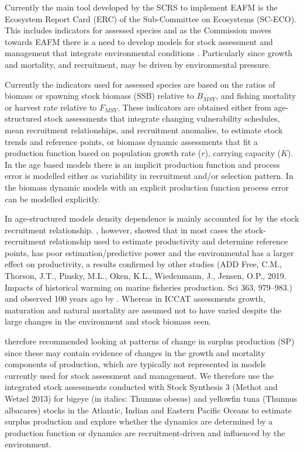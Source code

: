\documentclass[12pt,doublespacing,a4paper]{ouparticle}
\begin{document}
Currently the main tool developed by the SCRS to implement EAFM is the Ecosystem Report Card (ERC) of the Sub-Committee on Ecosystems (SC-ECO). This includes indicators for assessed species and as the Commission moves towards EAFM there is a need to develop models for stock assessment and management that integrate environmental conditions \citep{travis2014integrating}.  Particularly since growth and mortality, and recruitment, may be driven by environmental pressure.

Currently the indicators used for assessed species are based on the ratios of biomass or spawning stock biomass (SSB) relative to $B_{MSY}$, and fishing mortality or harvest rate relative to $F_{MSY}$. These indicators are obtained either from age-structured stock assessments that integrate changing vulnerability schedules, mean recruitment relationships, and recruitment anomalies, to estimate stock trends and reference points, or biomass dynamic assessments that fit a production function based on population growth rate ($r$), carrying capacity ($K$). In the age based models there is an implicit production function and process error is modelled either as variability in recruitment and/or selection pattern. In the biomass dynamic models with an explicit production function process error can be modelled explicitly.  

In age-structured models density dependence is mainly accounted for by the stock recruitment relationship. \cite{cury2014resolving}, however, showed that in most cases the stock-recruitment relationship used to estimate productivity and determine reference points, has poor estimation/predictive power and the environmental has a larger effect on productivity, a results confirmed by other studies \citep[e.g.][]{szuwalski2015examining, szuwalski2019global}(ADD Free, C.M., Thorson, J.T., Pinsky, M.L., Oken, K.L., Wiedenmann, J., Jensen, O.P., 2019. Impacts of historical warming on marine fisheries production. Sci 363, 979–983.) and observed 100 years ago by \cite{hjort1914fluctuations}. Whereas in ICCAT assessments growth, maturation and natural mortality are assumed not to have varied despite the large changes in the environment and stock biomass seen.

\cite{hilborn2001calculation} therefore recommended looking at patterns of change in surplus production (SP) since these may contain evidence of changes in the growth and mortality components of production, which are typically not represented in models currently used for stock assessment and management. 
We therefore use the integrated stock assessments conducted with Stock Synthesis 3 (Methot and Wetzel 2013) \cite[SS3]{methot2005technical} for bigeye (in italics: Thunnus obesus) and yellowfin tuna (Thunnus albacares) stocks in the Atlantic, Indian and Eastern Pacific Oceans to estimate surplus production and explore whether the dynamics are determined by a production function or dynamics are recruitment-driven and influenced by the environment.
\end{document}

